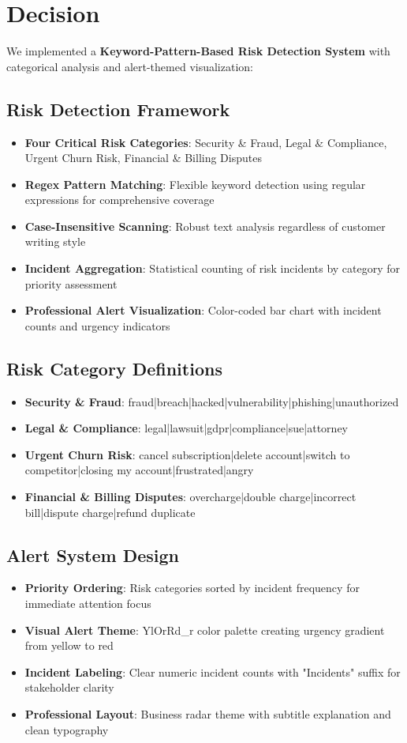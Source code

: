 \documentclass[11pt]{article}
\begin{document}
\section{Decision}

We implemented a \textbf{Keyword-Pattern-Based Risk Detection System} with categorical analysis and alert-themed visualization:

\subsection{Risk Detection Framework}
\begin{itemize}
\item \textbf{Four Critical Risk Categories}: Security \& Fraud, Legal \& Compliance, Urgent Churn Risk, Financial \& Billing Disputes
\item \textbf{Regex Pattern Matching}: Flexible keyword detection using regular expressions for comprehensive coverage
\item \textbf{Case-Insensitive Scanning}: Robust text analysis regardless of customer writing style
\item \textbf{Incident Aggregation}: Statistical counting of risk incidents by category for priority assessment
\item \textbf{Professional Alert Visualization}: Color-coded bar chart with incident counts and urgency indicators
\end{itemize}

\subsection{Risk Category Definitions}
\begin{itemize}
\item \textbf{Security \& Fraud}: fraud|breach|hacked|vulnerability|phishing|unauthorized
\item \textbf{Legal \& Compliance}: legal|lawsuit|gdpr|compliance|sue|attorney
\item \textbf{Urgent Churn Risk}: cancel subscription|delete account|switch to competitor|closing my account|frustrated|angry
\item \textbf{Financial \& Billing Disputes}: overcharge|double charge|incorrect bill|dispute charge|refund duplicate
\end{itemize}

\subsection{Alert System Design}
\begin{itemize}
\item \textbf{Priority Ordering}: Risk categories sorted by incident frequency for immediate attention focus
\item \textbf{Visual Alert Theme}: YlOrRd\_r color palette creating urgency gradient from yellow to red
\item \textbf{Incident Labeling}: Clear numeric incident counts with "Incidents" suffix for stakeholder clarity
\item \textbf{Professional Layout}: Business radar theme with subtitle explanation and clean typography
\end{itemize}
\end{document}
